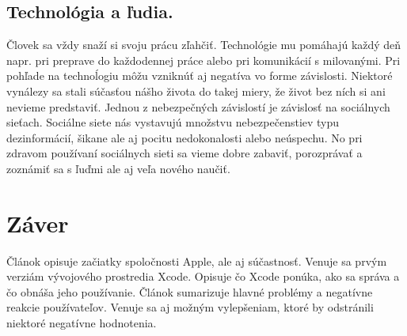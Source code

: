 \documentclass[12pt]{article}
\begin{document}
		\subsection{Technológia a ľudia.}
			Človek sa vždy snaží si svoju prácu zľahčiť.  Technológie mu pomáhajú každý deň napr.  pri preprave do každodennej práce alebo pri komunikácií s milovanými.   Pri pohľade na technoĺogiu môžu vzniknúť aj negatíva vo forme závislosti.  Niektoré vynálezy sa stali súčasťou nášho života do takej miery,  že život bez ních si ani nevieme predstaviť.  Jednou z nebezpečných závislostí je závislosť na sociálnych sieťach.  Sociálne siete nás vystavujú množstvu nebezpečenstiev typu dezinformácií,  šikane ale aj pocitu nedokonalosti alebo neúspechu.  No pri zdravom používaní sociálnych sieti sa vieme dobre zabaviť,  porozprávať a zoznámiť sa s ľuďmi ale aj veľa nového naučiť.  
			
	\newpage
		\section{Záver}
			Článok opisuje začiatky spoločnosti Apple,  ale aj súčastnosť.  Venuje sa prvým verziám vývojového prostredia Xcode.  Opisuje čo Xcode ponúka,  ako sa správa a čo obnáša jeho používanie.  Článok sumarizuje hlavné problémy a negatívne reakcie používateľov.  Venuje sa aj možným vylepšeniam,  ktoré by odstránili niektoré negatívne hodnotenia.   
			
	\newpage
		
		\renewcommand\refname{Referencie}
		{}
		
\end{document}
